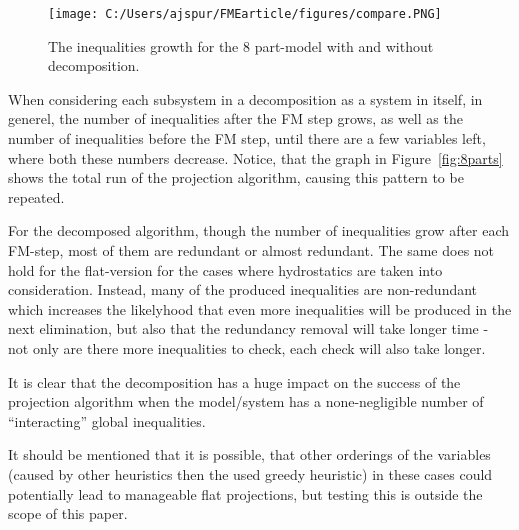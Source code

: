\begin{figure}
	\centering
		\texttt{[image: C:/Users/ajspur/FMEarticle/figures/compare.PNG]}
	\caption{The inequalities growth for the 8 part-model with and without decomposition.}
	\label{fig:compare}
\end{figure}
When considering each subsystem in a decomposition as a system in itself, in generel, the number of inequalities after the FM step grows, as well as the number of inequalities before the FM step, until there are a few variables left, where both these numbers decrease. Notice, that the graph in Figure~\ref{fig:8parts} shows the total run of the projection algorithm, causing this pattern to be repeated.

For the decomposed algorithm, though the number of inequalities grow after each FM-step, most of them are redundant or almost redundant. The same does not hold for the flat-version for the cases where hydrostatics are taken into consideration. Instead, many of the produced inequalities are non-redundant which increases the likelyhood that even more inequalities will be produced in the next elimination, but also that the redundancy removal will take longer time - not only are there more inequalities to check, each check will also take longer. 


It is clear that the decomposition has a huge impact on the success of the projection algorithm when the model/system has a none-negligible number of ``interacting'' global inequalities.

It should be mentioned that it is possible, that other orderings of the variables (caused by other heuristics then the used greedy heuristic) in these cases could potentially lead to manageable flat projections, but testing this is outside the scope of this paper.  

